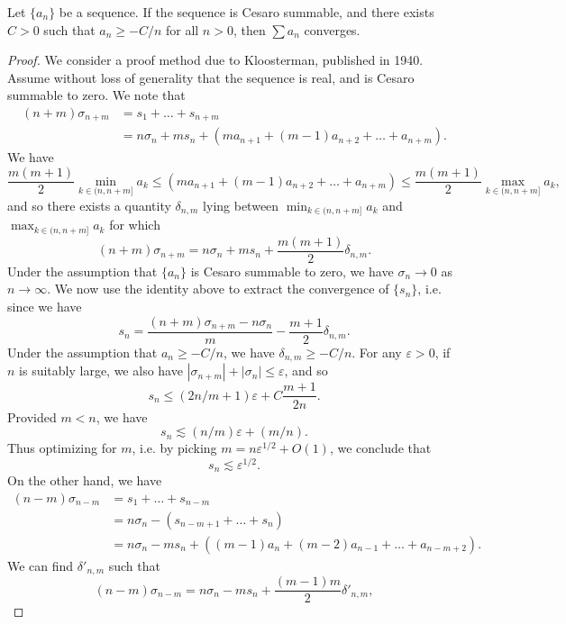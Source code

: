 \begin{theorem}
    Let $\{ a_n \}$ be a sequence. If the sequence is Cesaro summable, and there exists $C > 0$ such that $a_n \geq - C / n$ for all $n > 0$, then $\sum a_n$ converges.
\end{theorem}
\begin{proof}
    We consider a proof method due to Kloosterman, published in 1940. Assume without loss of generality that the sequence is real, and is Cesaro summable to zero. We note that
    \begin{align*}
        (n + m) \sigma_{n + m} &= s_1 + \dots + s_{n+m}\\
        &= n \sigma_n + m s_n + (m a_{n+1} + (m-1) a_{n+2} + \dots + a_{n+m}).
    \end{align*}
    We have
    \[ \frac{m(m+1)}{2} \min_{k \in (n,n+m]} a_k \leq (m a_{n+1} + (m-1) a_{n+2} + \dots + a_{n+m}) \leq \frac{m(m+1)}{2} \max_{k \in (n,n+m]} a_k, \]
    and so there exists a quantity $\delta_{n,m}$ lying between $\min_{k \in (n,n+m]} a_k$ and $\max_{k \in (n,n+m]} a_k$ for which
    \[ (n + m) \sigma_{n + m} = n \sigma_n + m s_n + \frac{m(m+1)}{2} \delta_{n,m}. \]
    Under the assumption that $\{ a_n \}$ is Cesaro summable to zero, we have $\sigma_n \to 0$ as $n \to \infty$. We now use the identity above to extract the convergence of $\{ s_n \}$, i.e. since we have
    \[ s_n = \frac{(n+m) \sigma_{n+m} - n \sigma_n}{m} - \frac{m+1}{2} \delta_{n,m}. \]
    Under the assumption that $a_n \geq - C / n$, we have $\delta_{n,m} \geq - C / n$. For any $\varepsilon > 0$, if $n$ is suitably large, we also have $|\sigma_{n+m}| + |\sigma_n| \leq \varepsilon$, and so
    \[ s_n \leq (2n/m + 1) \varepsilon + C \frac{m+1}{2n}. \]
    Provided $m < n$, we have
    \[ s_n \lesssim (n/m) \varepsilon + (m / n). \]
    Thus optimizing for $m$, i.e. by picking $m = n \varepsilon^{1/2} + O(1)$, we conclude that
    \[ s_n \lesssim \varepsilon^{1/2}. \]
    On the other hand, we have
    \begin{align*}
        (n - m) \sigma_{n - m} &= s_1 + \dots + s_{n-m}\\
        &= n \sigma_n - (s_{n-m+1} + \dots + s_n)\\
        &= n \sigma_n - m s_n + ( (m-1) a_n + (m-2) a_{n-1} + \dots + a_{n - m + 2} ).
    \end{align*}
    We can find $\delta'_{n,m}$ such that
    \[ (n - m) \sigma_{n - m} = n \sigma_n - m s_n + \frac{(m-1)m}{2} \delta'_{n,m}, \]

\end{proof}
